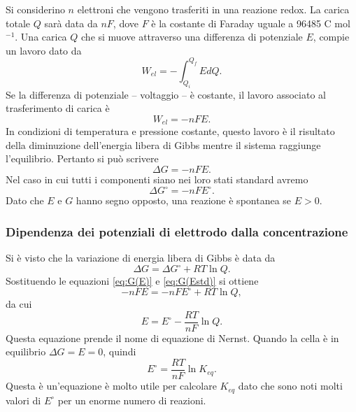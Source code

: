Si considerino $n$ elettroni che vengono trasferiti in una reazione redox. La carica totale $Q$ sarà data da $nF$, dove $F$ è la costante di Faraday uguale a 96485 C mol$^{-1}$. Una carica $Q$ che si muove attraverso una differenza di
potenziale $E$, compie un lavoro dato da
\begin{equation}
    W_{el}=-\int_{Q_i}^{Q_f}EdQ.
\end{equation}
Se la differenza di potenziale – voltaggio – è costante, il lavoro associato al trasferimento di carica è
\begin{equation}
    W_{el}=-nFE.
\end{equation}
In condizioni di temperatura e pressione costante, questo lavoro è il risultato della diminuzione dell'energia libera di Gibbs mentre il sistema raggiunge l'equilibrio. Pertanto si può scrivere
\begin{equation}\label{eq:G(E)}
    \Delta G=-nFE.
\end{equation}
Nel caso in cui tutti i componenti siano nei loro stati standard avremo
\begin{equation}\label{eq:G(Estd)}
    \Delta G^\circ=-nFE^\circ.
\end{equation}
Dato che $E$ e $G$ hanno segno opposto, una reazione è spontanea se $E>0$.

\subsubsection{Dipendenza dei potenziali di elettrodo dalla concentrazione}
Si è visto che la variazione di energia libera di Gibbs è data da
\begin{equation}
    \Delta G=\Delta G^\circ+RT\ln{Q}.
\end{equation}
Sostituendo le equazioni \eqref{eq:G(E)} e \eqref{eq:G(Estd)} si ottiene
\begin{equation}
    -nFE=-nFE^\circ+RT\ln{Q},
\end{equation}
da cui
\begin{equation}
    E=E^\circ-\frac{RT}{nF}\ln{Q}.
\end{equation}
Questa equazione prende il nome di equazione di Nernst. Quando la cella è in equilibrio $\Delta G=E=0$, quindi 
\begin{equation}
    E^\circ= \frac{RT}{nF}\ln{K_{eq}}.
\end{equation}
Questa è un'equazione è molto utile per calcolare $K_{eq}$ dato che sono noti molti valori di $E^\circ$ per un enorme numero di reazioni.

